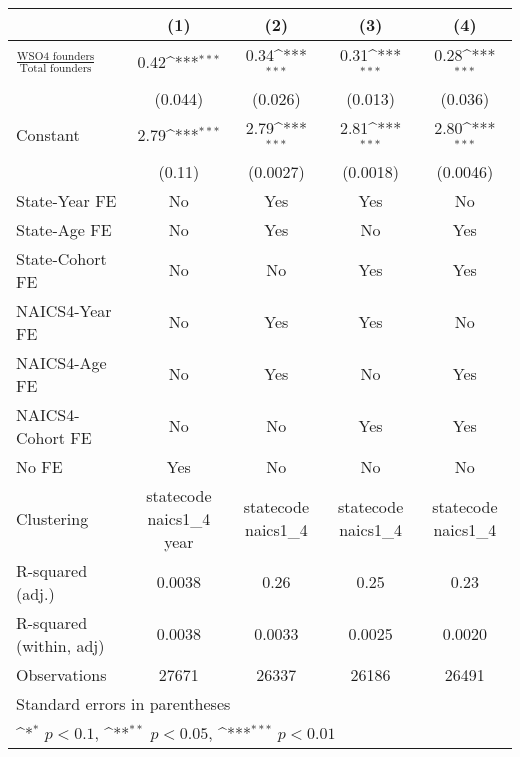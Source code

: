 {
\def\sym#1{\ifmmode^{#1}\else\(^{#1}\)\fi}
\begin{tabular}{l*{4}{c}}
\toprule
                    &\multicolumn{1}{c}{(1)}         &\multicolumn{1}{c}{(2)}         &\multicolumn{1}{c}{(3)}         &\multicolumn{1}{c}{(4)}         \\
\midrule
$\frac{\text{WSO4 founders}}{\text{Total founders}}$&        0.42\sym{***}&        0.34\sym{***}&        0.31\sym{***}&        0.28\sym{***}\\
                    &     (0.044)         &     (0.026)         &     (0.013)         &     (0.036)         \\
\addlinespace
Constant            &        2.79\sym{***}&        2.79\sym{***}&        2.81\sym{***}&        2.80\sym{***}\\
                    &      (0.11)         &    (0.0027)         &    (0.0018)         &    (0.0046)         \\
\addlinespace
State-Year FE       &          No         &         Yes         &         Yes         &          No         \\
\addlinespace
State-Age FE        &          No         &         Yes         &          No         &         Yes         \\
\addlinespace
State-Cohort FE     &          No         &          No         &         Yes         &         Yes         \\
\addlinespace
NAICS4-Year FE      &          No         &         Yes         &         Yes         &          No         \\
\addlinespace
NAICS4-Age FE       &          No         &         Yes         &          No         &         Yes         \\
\addlinespace
NAICS4-Cohort FE    &          No         &          No         &         Yes         &         Yes         \\
\addlinespace
No FE               &         Yes         &          No         &          No         &          No         \\
\midrule
Clustering          &statecode naics1\_4 year         &statecode naics1\_4         &statecode naics1\_4         &statecode naics1\_4         \\
R-squared (adj.)    &      0.0038         &        0.26         &        0.25         &        0.23         \\
R-squared (within, adj)&      0.0038         &      0.0033         &      0.0025         &      0.0020         \\
Observations        &       27671         &       26337         &       26186         &       26491         \\
\bottomrule
\multicolumn{5}{l}{\footnotesize Standard errors in parentheses}\\
\multicolumn{5}{l}{\footnotesize \sym{*} \(p<0.1\), \sym{**} \(p<0.05\), \sym{***} \(p<0.01\)}\\
\end{tabular}
}
